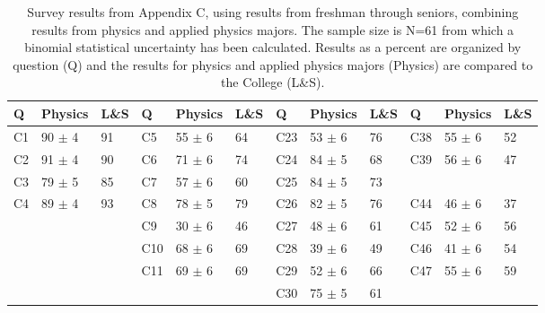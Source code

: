 \documentclass[12pt]{article}
\begin{document}
\begin{table}[htbp]
\caption{\label{tbl:appc} Survey results from Appendix C, using results from freshman through seniors, combining results from physics and applied physics majors. The sample size is N=61 from which a binomial statistical uncertainty has been calculated.  Results as a percent are organized by question (Q) and the results for physics and applied physics majors (Physics) are compared to the College (L\&S).}
\begin{center}
\begin{tabular}{|lll|lll|lll|lll|}
\hline
Q & Physics & L\&S & Q & Physics & L\&S & Q & Physics & L\&S & Q & Physics & L\&S \\
\hline
C1 & 90 $\pm$ 4 & 91 & C5  & 55 $\pm$ 6 & 64 & C23 & 53 $\pm$ 6 & 76 & C38 & 55 $\pm$ 6 & 52 \\
C2 & 91 $\pm$ 4 & 90 & C6  & 71 $\pm$ 6 & 74 & C24 & 84 $\pm$ 5 & 68 & C39 & 56 $\pm$ 6 & 47 \\
C3 & 79 $\pm$ 5 & 85 & C7  & 57 $\pm$ 6 & 60 & C25 & 84 $\pm$ 5 & 73 &     &            &    \\                  
C4 & 89 $\pm$ 4 & 93 & C8  & 78 $\pm$ 5 & 79 & C26 & 82 $\pm$ 5 & 76 & C44 & 46 $\pm$ 6 & 37 \\
~  &            &    & C9  & 30 $\pm$ 6 & 46 & C27 & 48 $\pm$ 6 & 61 & C45 & 52 $\pm$ 6 & 56 \\
~  &            &    & C10 & 68 $\pm$ 6 & 69 & C28 & 39 $\pm$ 6 & 49 & C46 & 41 $\pm$ 6 & 54 \\
~  &            &    & C11 & 69 $\pm$ 6 & 69 & C29 & 52 $\pm$ 6 & 66 & C47 & 55 $\pm$ 6 & 59 \\
~  &            &    &     &            &    & C30 & 75 $\pm$ 5 & 61 &     &            &    \\
\hline 
\end{tabular}
\end{center}
\end{table}
\end{document}
